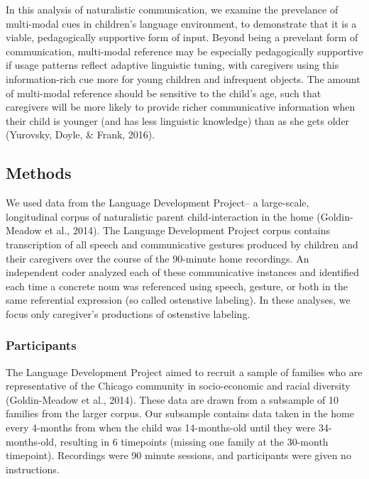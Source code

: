 \documentclass[english,,man,floatsintext]{apa6}
\begin{document}
In this analysis of naturalistic communication, we examine the prevelance of multi-modal cues in children's language environment, to demonstrate that it is a viable, pedagogically supportive form of input. Beyond being a prevelant form of communication, multi-modal reference may be especially pedagogically supportive if usage patterns reflect adaptive linguistic tuning, with caregivers using this information-rich cue more for young children and infrequent objects. The amount of multi-modal reference should be sensitive to the child's age, such that caregivers will be more likely to provide richer communicative information when their child is younger (and has less linguistic knowledge) than as she gets older (Yurovsky, Doyle, \& Frank, 2016).

\hypertarget{methods}{%
\subsection{Methods}\label{methods}}

We used data from the Language Development Project-- a large-scale, longitudinal corpus of naturalistic parent child-interaction in the home (Goldin-Meadow et al., 2014). The Language Development Project corpus contains transcription of all speech and communicative gestures produced by children and their caregivers over the course of the 90-minute home recordings. An independent coder analyzed each of these communicative instances and identified each time a concrete noun was referenced using speech, gesture, or both in the same referential expression (so called ostenstive labeling). In these analyses, we focus only caregiver's productions of ostenstive labeling.

\hypertarget{participants}{%
\subsubsection{Participants}\label{participants}}

The Language Development Project aimed to recruit a sample of families who are representative of the Chicago community in socio-economic and racial diversity (Goldin-Meadow et al., 2014). These data are drawn from a subsample of 10 families from the larger corpus. Our subsample contains data taken in the home every 4-months from when the child was 14-months-old until they were 34-months-old, resulting in 6 timepoints (missing one family at the 30-month timepoint). Recordings were 90 minute sessions, and participants were given no instructions.
\end{document}
